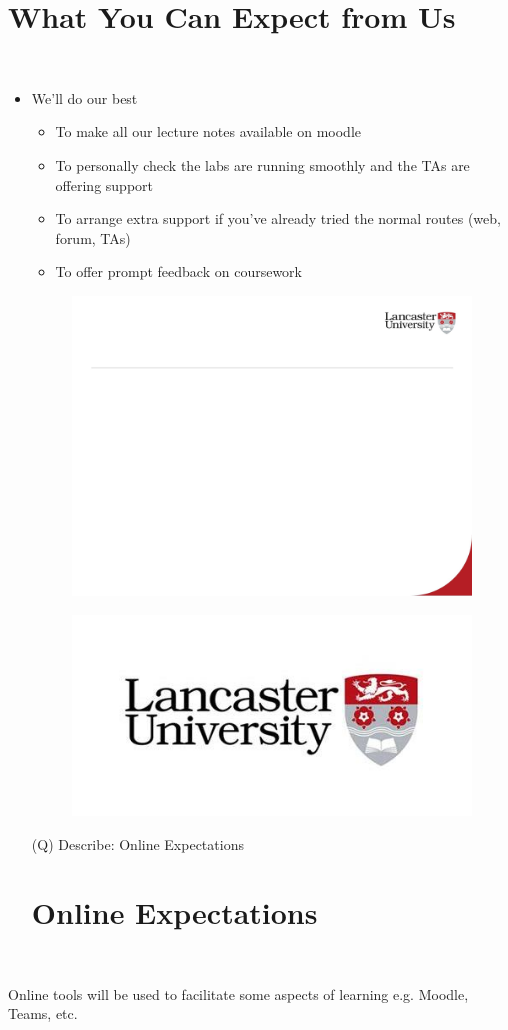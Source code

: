 \documentclass[12pt]{article}
\begin{document}
\section{What You Can Expect from Us}
\\
\begin{itemize}
  \item We’ll do our best
\begin{itemize}
  \item To make all our lecture notes available on moodle
  \item To personally check the labs are running smoothly and the TAs are offering support
  \item To arrange extra support if you’ve already tried the normal routes (web, forum, TAs)
  \item To offer prompt feedback on coursework
\end{itemize}
\begin{figure}[H]
\includegraphics[width=0.5\linewidth]{page12-image-1.png}
\end{figure}
\begin{figure}[H]
\includegraphics[width=0.5\linewidth]{page12-image-2.png}
\end{figure}
\clearpage
(Q)
Describe: Online Expectations
\clearpage
\section{Online Expectations}
\\
\end{itemize}
  \item Online tools will be used to facilitate some aspects of learning e.g. Moodle, Teams, etc.
\end{document}
